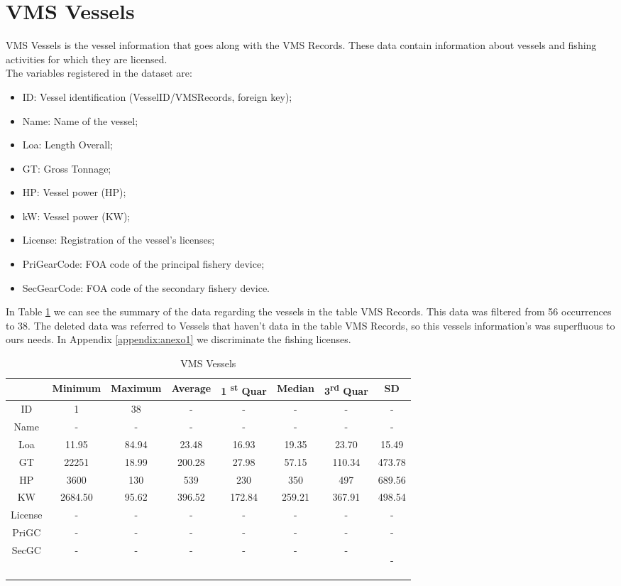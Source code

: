 \section{VMS Vessels} %
\label{sub:vms_vessels}
VMS Vessels is the vessel information that goes along with the VMS Records. These data contain information about vessels and fishing activities for which they are licensed.  \\
The variables registered in the dataset are:
\begin{itemize}
\item	ID: Vessel identification (VesselID/VMSRecords, foreign key);
\item	Name: Name of the vessel;
\item	Loa: Length Overall; 
\item	GT: Gross Tonnage;
\item	HP: Vessel power (HP);
\item	kW: Vessel power (KW);
\item	License: Registration of the vessel's licenses;
\item	PriGearCode: FOA code of the principal fishery device;
\item	SecGearCode: FOA code of the secondary fishery device.
\end{itemize}

In Table \ref{table:vms_vessels} we can see the summary of the data regarding the vessels in the table VMS Records. This data was filtered from 56 occurrences to 38. The deleted data was referred to Vessels that haven’t data in the table VMS Records, so this vessels information’s was superfluous to ours needs. In Appendix \ref{appendix:anexo1} we discriminate the fishing licenses. 


\begin {table}[H]
\small
\begin{center}
\begin{tabular}{c|c|c|c|c|c|c|c}
            &  Minimum & Maximum & Average & 1 \textsuperscript{st} Quar & Median & 3\textsuperscript{rd} Quar & SD \\
\hline
ID     & 1&38&-&-&-&-&-\\
Name         &-&-&-&-&-&-&-\\
Loa         & 11.95&84.94&23.48&16.93&19.35&23.70&15.49\\
GT        &22251&18.99&200.28&27.98&57.15&110.34&473.78\\
HP        & 3600&130&539&230&350&497&689.56\\
KW        &2684.50&95.62&396.52&172.84&259.21&367.91&498.54\\
License        &-&-&-&-&-&-&-\\
PriGC       &-&-&-&-&-&-&-\\
SecGC        &-&-&-&-&-&-&-


           
\label{table:vms_vessels}
\end{tabular}
\caption {VMS Vessels}
\end{center}
\end {table}

